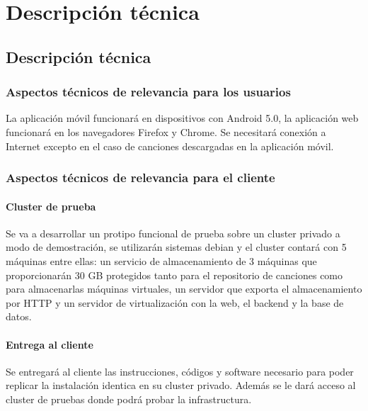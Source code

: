 
\chapter{Descripci\'on t\'ecnica} %

\label{Chapter3} %


\section{Descripci\'on t\'ecnica}

\subsection{Aspectos t\'ecnicos de relevancia para los usuarios}
La aplicaci\'on m\'ovil funcionar\'a en dispositivos con Android 5.0, la aplicaci\'on web funcionar\'a en los navegadores Firefox y Chrome. Se necesitar\'a conexi\'on a Internet excepto en el caso de canciones descargadas en la aplicaci\'on m\'ovil. 
\subsection{Aspectos t\'ecnicos de relevancia para el cliente}
\subsubsection{Cluster de prueba}
Se va a desarrollar un protipo funcional de prueba sobre un cluster privado a modo de demostración, se utilizarán sistemas debian y el cluster contar\'a con 5 m\'aquinas entre ellas: un servicio de almacenamiento de 3 m\'aquinas que proporcionar\'an 30 GB protegidos tanto para el repositorio de canciones como para almacenarlas m\'aquinas virtuales, un servidor que exporta el almacenamiento por HTTP y un servidor de virtualización con la web, el backend y la base de datos.
\subsubsection{Entrega al cliente}
Se entregar\'a al cliente las instrucciones, c\'odigos y software necesario para poder replicar la instalaci\'on identica en su cluster privado. Adem\'as se le dar\'a acceso al cluster de pruebas donde podr\'a probar la infrastructura.
